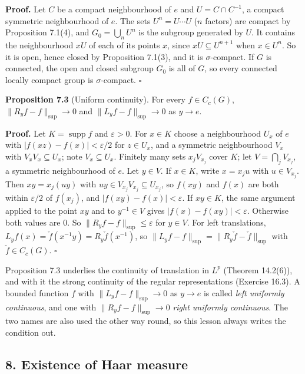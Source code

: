 \documentclass[
  english,
  11pt,
  a4paper,
]{article}
\begin{document}
\textbf{Proof.} Let \(C\) be a compact neighbourhood of \(e\) and
\(U=C\cap C^{-1}\), a compact symmetric neighbourhood of \(e\). The sets
\(U^n=U\cdots U\) (\(n\) factors) are compact by Proposition 7.1(4), and
\(G_0=\bigcup_nU^n\) is the subgroup generated by \(U\). It contains the
neighbourhood \(xU\) of each of its points \(x\), since
\(xU\subseteq U^{n+1}\) when \(x\in U^n\). So it is open, hence closed
by Proposition 7.1(3), and it is \(\sigma\)-compact. If \(G\) is
connected, the open and closed subgroup \(G_0\) is all of \(G\), so
every connected locally compact group is \(\sigma\)-compact. \(\square\)

\textbf{Proposition 7.3} (Uniform continuity). For every
\(f\in C_c(G)\), \(\|R_yf-f\|_{\sup}\to0\) and \(\|L_yf-f\|_{\sup}\to0\)
as \(y\to e\).

\textbf{Proof.} Let \(K=\operatorname{supp}f\) and \(\varepsilon>0\).
For \(x\in K\) choose a neighbourhood \(U_x\) of \(e\) with
\(|f(xz)-f(x)|<\varepsilon/2\) for \(z\in U_x\), and a symmetric
neighbourhood \(V_x\) with \(V_xV_x\subseteq U_x\); note
\(V_x\subseteq U_x\). Finitely many sets \(x_jV_{x_j}\) cover \(K\); let
\(V=\bigcap_jV_{x_j}\), a symmetric neighbourhood of \(e\). Let
\(y\in V\). If \(x\in K\), write \(x=x_ju\) with \(u\in V_{x_j}\). Then
\(xy=x_j(uy)\) with \(uy\in V_{x_j}V_{x_j}\subseteq U_{x_j}\), so
\(f(xy)\) and \(f(x)\) are both within \(\varepsilon/2\) of \(f(x_j)\),
and \(|f(xy)-f(x)|<\varepsilon\). If \(xy\in K\), the same argument
applied to the point \(xy\) and to \(y^{-1}\in V\) gives
\(|f(x)-f(xy)|<\varepsilon\). Otherwise both values are \(0\). So
\(\|R_yf-f\|_{\sup}\leq\varepsilon\) for \(y\in V\). For left
translations, \(L_yf(x)=\check f(x^{-1}y)=R_y\check f(x^{-1})\), so
\(\|L_yf-f\|_{\sup}=\|R_y\check f-\check f\|_{\sup}\) with
\(\check f\in C_c(G)\). \(\square\)

Proposition 7.3 underlies the continuity of translation in \(L^p\)
(Theorem 14.2(6)), and with it the strong continuity of the regular
representations (Exercise 16.3). A bounded function \(f\) with
\(\|L_yf-f\|_{\sup}\to0\) as \(y\to e\) is called \emph{left uniformly
continuous}, and one with \(\|R_yf-f\|_{\sup}\to0\) \emph{right
uniformly continuous}. The two names are also used the other way round,
so this lesson always writes the condition out.

\subsection[8. Existence of Haar
measure]{\texorpdfstring{\protect\hypertarget{haar-measure-on-locally-compact-groups--oa-fnd-hm-05}{}{}8.
Existence of Haar
measure}{8. Existence of Haar measure}}\label{haar-measure-on-locally-compact-groups--OA-FND-HM-05}
\end{document}
